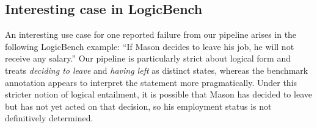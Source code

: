 \documentclass{article} %
\begin{document}
\subsection{Interesting case in LogicBench}
\label{app:case1}
 An interesting use case for one reported failure from our pipeline arises in the following LogicBench example: ``If Mason decides to leave his job, he will not receive any salary.'' Our pipeline is particularly strict about logical form and treats \emph{deciding to leave} and \emph{having left} as distinct states, whereas the benchmark annotation appears to interpret the statement more pragmatically. Under this stricter notion of logical entailment, it is possible that Mason has decided to leave but has not yet acted on that decision, so his employment status is not definitively determined. 
\end{document}
